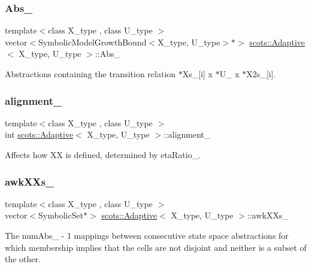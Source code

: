 \subsubsection{\texorpdfstring{Abs\+\_\+}{Abs\_}}
{\footnotesize\ttfamily template$<$class X\+\_\+type , class U\+\_\+type $>$ \\
vector$<$Symbolic\+Model\+Growth\+Bound$<$X\+\_\+type, U\+\_\+type$>$$\ast$$>$ \hyperlink{classscots_1_1Adaptive}{scots\+::\+Adaptive}$<$ X\+\_\+type, U\+\_\+type $>$\+::Abs\+\_\+}

Abstractions containing the transition relation  $\ast$\+Xs\+\_\+\mbox{[}i\mbox{]} x $\ast$\+U\+\_\+ x $\ast$\+X2s\+\_\+\mbox{[}i\mbox{]}. \mbox{\label{classscots_1_1Adaptive_ad4f525a5a65b284da14369a54532cf39}} 
\subsubsection{\texorpdfstring{alignment\+\_\+}{alignment\_}}
{\footnotesize\ttfamily template$<$class X\+\_\+type , class U\+\_\+type $>$ \\
int \hyperlink{classscots_1_1Adaptive}{scots\+::\+Adaptive}$<$ X\+\_\+type, U\+\_\+type $>$\+::alignment\+\_\+}

Affects how XX is defined, determined by eta\+Ratio\+\_\+. \mbox{\label{classscots_1_1Adaptive_ae7e9ac7e500e7f06931138b68ad48aac}} 
\subsubsection{\texorpdfstring{awk\+X\+Xs\+\_\+}{awkXXs\_}}
{\footnotesize\ttfamily template$<$class X\+\_\+type , class U\+\_\+type $>$ \\
vector$<$Symbolic\+Set$\ast$$>$ \hyperlink{classscots_1_1Adaptive}{scots\+::\+Adaptive}$<$ X\+\_\+type, U\+\_\+type $>$\+::awk\+X\+Xs\+\_\+}

The num\+Abs\+\_\+ -\/ 1 mappings between consecutive state space abstractions for which membership implies that the cells are not disjoint and neither is a subset of the other. \mbox{\label{classscots_1_1Adaptive_a4937d441ac9758f33bcceeb9975fb1ce}} 
